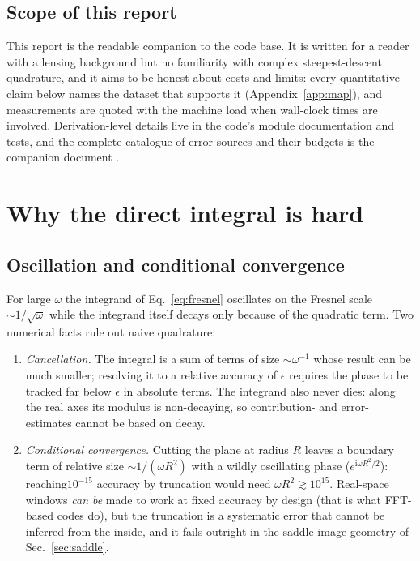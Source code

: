 \documentclass[11pt,a4paper]{article}
\newcommand{\ii}{\mathrm{i}}
\begin{document}
\subsection{Scope of this report}
\label{sec:scope}

This report is the readable companion to the code base.  It is written for a
reader with a lensing background but no familiarity with complex
steepest-descent quadrature, and it aims to be honest about costs and
limits: every quantitative claim below names the dataset that supports it
(Appendix~\ref{app:map}), and measurements are quoted with the machine load
when wall-clock times are involved.  Derivation-level details live in the
code's module documentation and tests, and the complete catalogue of error
sources and their budgets is the companion document
.

\section{Why the direct integral is hard}
\label{sec:hard}

\subsection{Oscillation and conditional convergence}

For large $\omega$ the integrand of Eq.~\eqref{eq:fresnel} oscillates on the
Fresnel scale $\sim 1/\sqrt{\omega}$ while the integrand itself decays only
because of the quadratic term.  Two numerical facts rule out naive
quadrature:

\begin{enumerate}
\item \emph{Cancellation.}  The integral is a sum of terms of size $\sim
  \omega^{-1}$ whose result can be much smaller; resolving it to a relative
  accuracy of $\epsilon$ requires the phase to be tracked far below
  $\epsilon$ in absolute terms.  The integrand also never dies: along the
  real axes its modulus is non-decaying, so contribution- and
  error-estimates cannot be based on decay.
\item \emph{Conditional convergence.}  Cutting the plane at radius $R$
  leaves a boundary term of relative size
  $\sim 1/(\omega R^2)$ with a wildly oscillating phase
  ($e^{\ii\omega R^2/2}$): reaching$10^{-15}$ accuracy by truncation would
  need $\omega R^2 \gtrsim 10^{15}$.  Real-space windows \emph{can be} made
  to work at fixed accuracy by design (that is what FFT-based codes do), but
  the truncation is a systematic error that cannot be inferred from the
  inside, and it fails outright in the saddle-image geometry of
  Sec.~\ref{sec:saddle}.
\end{enumerate}
\end{document}
